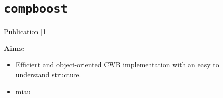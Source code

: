 \documentclass[t,10pt]{beamer}
\begin{document}
\section{\texttt{compboost}}

\begin{frame}{Publication [1]}
  \vspace{-0.2cm}
  \begin{figure}
    \centering
  \end{figure}
  \vspace{-0.4cm}

  \textbf{Aims:}
  \begin{itemize}
    \item
      Efficient and object-oriented CWB implementation with an easy to understand structure.
    \item
      miau
  \end{itemize}
\end{frame}
\end{document}
